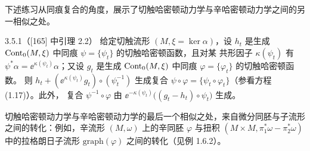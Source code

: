 下述练习从同痕复合的角度，展示了切触哈密顿动力学与辛哈密顿动力学之间的另
一相似之处。

\begin{wexer}{3.5.1}（[165] 中引理 2.2）
给定切触流形 $(M,\xi=\ker\alpha)$，设 $h_t$ 是生成
$\operatorname{Cont}_0(M,\xi)$ 中同痕 $\psi=\{\psi_t\}$ 的切触哈密顿函数，且对某
共形因子 $\kappa(\psi_t)$ 有
$\psi^*\alpha=\ee^{\kappa(\psi_t)}\alpha$；又设 $g_t$ 是生成
$\operatorname{Cont}_0(M,\xi)$ 中同痕 $\varphi=\{\varphi_t\}$ 的切触哈密顿函数。
则 $h_t+(\ee^{\kappa(\psi_t)}g_t)\circ(\psi_t^{-1})$ 生成复合
$\psi\circ\varphi=\{\psi_t\circ\varphi_t\}$（参看方程 (1.17)）。此外，
复合 $\psi^{-1}\circ\varphi$ 由
$\ee^{-\kappa(\psi_t)}\bigl((g_t-h_t)\circ\psi_t\bigr)$ 生成。
\end{wexer}


切触哈密顿动力学与辛哈密顿动力学的最后一个相似之处，来自微分同胚与子流形
之间的转化：例如，辛流形 $(M,\omega)$ 上的辛同胚 $\varphi$ 与扭积
$(M\times M,\pi_1^*\omega-\pi_2^*\omega)$ 中的拉格朗日子流形
$\mathrm{graph}(\varphi)$ 之间的转化（见例 1.6.2）。

